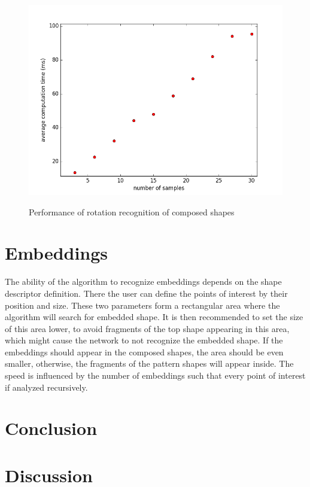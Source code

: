\begin{figure}[!htb]
\begin{center}
\label{fig:rotation_comp_speed}
\includegraphics[width=\linewidth]{ext/rotation_comp_speed.png}
\end{center}
    \centering
    \caption{Performance of rotation recognition of composed shapes}
\end{figure}

\section{Embeddings}
The ability of the algorithm to recognize embeddings depends on the shape descriptor definition. There the user can define the points of interest by their position and size. These two parameters form a rectangular area where the algorithm will search for embedded shape. It is then recommended to set the size of this area lower, to avoid fragments of the top shape appearing in this area, which might cause the network to not recognize the embedded shape. If the embeddings should appear in the composed shapes, the area should be even smaller, otherwise, the fragments of the pattern shapes will appear inside. The speed is influenced by the number of embeddings such that every point of interest if analyzed recursively.

\section{Conclusion}

\section{Discussion}


